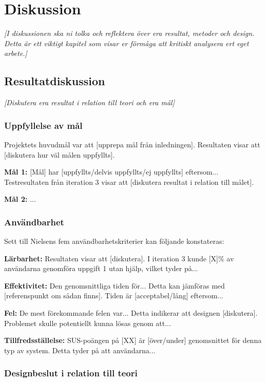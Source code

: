 \section{Diskussion}

\textit{[I diskussionen ska ni tolka och reflektera över era resultat, metoder och design. Detta är ett viktigt kapitel som visar er förmåga att kritiskt analysera ert eget arbete.]}


\subsection{Resultatdiskussion}

\textit{[Diskutera era resultat i relation till teori och era mål]}

\subsubsection{Uppfyllelse av mål}

Projektets huvudmål var att [upprepa mål från inledningen]. Resultaten visar att [diskutera hur väl målen uppfyllts].

\textbf{Mål 1:} [Mål] har [uppfyllts/delvis uppfyllts/ej uppfyllts] eftersom... Testresultaten från iteration 3 visar att [diskutera resultat i relation till målet].

\textbf{Mål 2:} ...


\subsubsection{Användbarhet}

Sett till Nielsens fem användbarhetskriterier \cite{nielsen2012} kan följande konstateras:

\textbf{Lärbarhet:} Resultaten visar att [diskutera]. I iteration 3 kunde [X]\% av användarna genomföra uppgift 1 utan hjälp, vilket tyder på...

\textbf{Effektivitet:} Den genomsnittliga tiden för... Detta kan jämföras med [referenspunkt om sådan finns]. Tiden är [acceptabel/lång] eftersom...

\textbf{Fel:} De mest förekommande felen var... Detta indikerar att designen [diskutera]. Problemet skulle potentiellt kunna lösas genom att...

\textbf{Tillfredsställelse:} SUS-poängen på [XX] är [över/under] genomsnittet för denna typ av system. Detta tyder på att användarna...


\subsubsection{Designbeslut i relation till teori}

